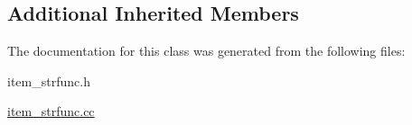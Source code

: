 \subsection*{Additional Inherited Members}


The documentation for this class was generated from the following files\+:\begin{DoxyCompactItemize}
\item 
item\+\_\+strfunc.\+h\item 
\mbox{\hyperlink{item__strfunc_8cc}{item\+\_\+strfunc.\+cc}}\end{DoxyCompactItemize}
